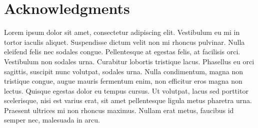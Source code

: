 \chapter*{Acknowledgments}


Lorem ipsum dolor sit amet, consectetur adipiscing elit. Vestibulum eu mi in tortor iaculis aliquet. Suspendisse dictum velit non mi rhoncus pulvinar. Nulla eleifend felis nec sodales congue. Pellentesque at egestas felis, at facilisis orci. Vestibulum non sodales urna. Curabitur lobortis tristique lacus. Phasellus eu orci sagittis, suscipit nunc volutpat, sodales urna. Nulla condimentum, magna non tristique congue, augue mauris fermentum enim, non efficitur eros magna non lectus. Quisque egestas dolor eu tempus cursus. Ut volutpat, lacus sed porttitor scelerisque, nisi est varius erat, sit amet pellentesque ligula metus pharetra urna. Praesent ultrices mi non rhoncus maximus. Nullam erat metus, faucibus id semper nec, malesuada in arcu.




